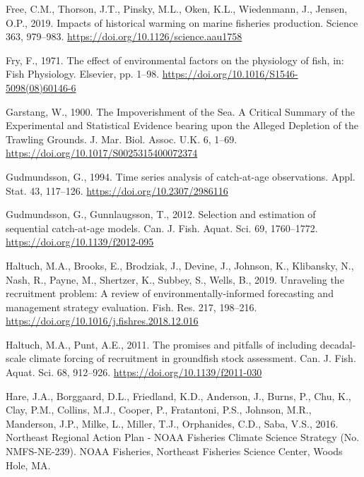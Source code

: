 \documentclass[]{article}
\begin{document}
\leavevmode\hypertarget{ref-free2019Impacts}{}%
Free, C.M., Thorson, J.T., Pinsky, M.L., Oken, K.L., Wiedenmann, J.,
Jensen, O.P., 2019. Impacts of historical warming on marine fisheries
production. Science 363, 979--983.
\url{https://doi.org/10.1126/science.aau1758}

\leavevmode\hypertarget{ref-fry1971Effect}{}%
Fry, F., 1971. The effect of environmental factors on the physiology of
fish, in: Fish Physiology. Elsevier, pp. 1--98.
\url{https://doi.org/10.1016/S1546-5098(08)60146-6}

\leavevmode\hypertarget{ref-garstang1900Impoverishment}{}%
Garstang, W., 1900. The Impoverishment of the Sea. A Critical Summary of
the Experimental and Statistical Evidence bearing upon the Alleged
Depletion of the Trawling Grounds. J. Mar. Biol. Assoc. U.K. 6, 1--69.
\url{https://doi.org/10.1017/S0025315400072374}

\leavevmode\hypertarget{ref-gudmundsson1994Time}{}%
Gudmundsson, G., 1994. Time series analysis of catch-at-age
observations. Appl. Stat. 43, 117--126.
\url{https://doi.org/10.2307/2986116}

\leavevmode\hypertarget{ref-gudmundsson2012Selection}{}%
Gudmundsson, G., Gunnlaugsson, T., 2012. Selection and estimation of
sequential catch-at-age models. Can. J. Fish. Aquat. Sci. 69,
1760--1772. \url{https://doi.org/10.1139/f2012-095}

\leavevmode\hypertarget{ref-haltuch2019Unraveling}{}%
Haltuch, M.A., Brooks, E., Brodziak, J., Devine, J., Johnson, K.,
Klibansky, N., Nash, R., Payne, M., Shertzer, K., Subbey, S., Wells, B.,
2019. Unraveling the recruitment problem: A review of
environmentally-informed forecasting and management strategy evaluation.
Fish. Res. 217, 198--216.
\url{https://doi.org/10.1016/j.fishres.2018.12.016}

\leavevmode\hypertarget{ref-haltuch2011Promises}{}%
Haltuch, M.A., Punt, A.E., 2011. The promises and pitfalls of including
decadal-scale climate forcing of recruitment in groundfish stock
assessment. Can. J. Fish. Aquat. Sci. 68, 912--926.
\url{https://doi.org/10.1139/f2011-030}

\leavevmode\hypertarget{ref-hare2016Northeast}{}%
Hare, J.A., Borggaard, D.L., Friedland, K.D., Anderson, J., Burns, P.,
Chu, K., Clay, P.M., Collins, M.J., Cooper, P., Fratantoni, P.S.,
Johnson, M.R., Manderson, J.P., Milke, L., Miller, T.J., Orphanides,
C.D., Saba, V.S., 2016. Northeast Regional Action Plan - NOAA Fisheries
Climate Science Strategy (No. NMFS-NE-239). NOAA Fisheries, Northeast
Fisheries Science Center, Woods Hole, MA.
\end{document}
